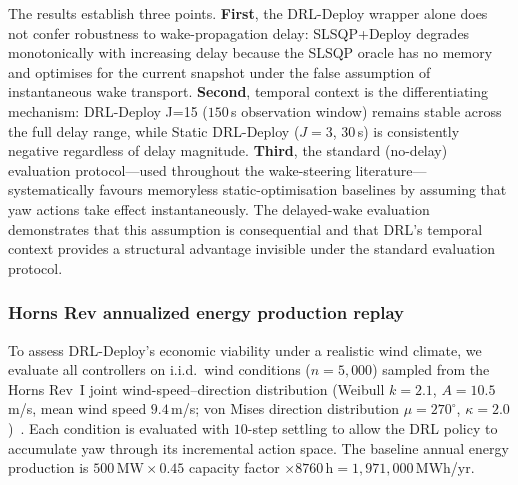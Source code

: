 \documentclass[final,5p,times]{elsarticle}
\begin{document}
The results establish three points. \textbf{First}, the DRL-Deploy wrapper alone does not confer robustness to wake-propagation delay: SLSQP+Deploy degrades monotonically with increasing delay because the SLSQP oracle has no memory and optimises for the current snapshot under the false assumption of instantaneous wake transport. \textbf{Second}, temporal context is the differentiating mechanism: DRL-Deploy J=15 ($150$\,s observation window) remains stable across the full delay range, while Static DRL-Deploy ($J{=}3$, $30$\,s) is consistently negative regardless of delay magnitude. \textbf{Third}, the standard (no-delay) evaluation protocol---used throughout the wake-steering literature---systematically favours memoryless static-optimisation baselines by assuming that yaw actions take effect instantaneously. The delayed-wake evaluation demonstrates that this assumption is consequential and that DRL's temporal context provides a structural advantage invisible under the standard evaluation protocol.

\subsubsection{Horns Rev annualized energy production replay}\label{sec:hornsrev_aep}

To assess DRL-Deploy's economic viability under a realistic wind climate, we evaluate all controllers on i.i.d.\ wind conditions ($n{=}5{,}000$) sampled from the Horns Rev~I joint wind-speed--direction distribution (Weibull $k{=}2.1$, $A{=}10.5$\,m/s, mean wind speed $9.4$\,m/s; von Mises direction distribution $\mu{=}270^\circ$, $\kappa{=}2.0$)~\citep{Barthelmie2009,Hansen2012}. Each condition is evaluated with $10$-step settling to allow the DRL policy to accumulate yaw through its incremental action space. The baseline annual energy production is $500\,\mathrm{MW}\times0.45$ capacity factor $\times8760\,\mathrm{h}=1{,}971{,}000$\,MWh/yr.
\end{document}
